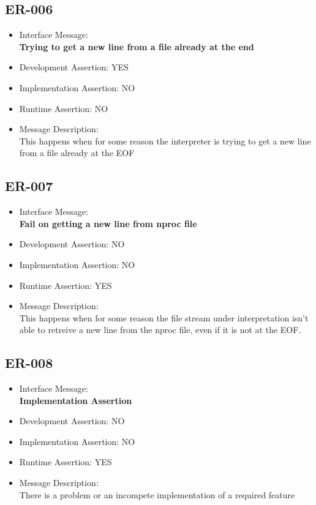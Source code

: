\subsection{ER-006}
\begin{itemize}
  \item Interface Message:\\[1em]\textbf{Trying to get a new line from a file already at the end}
  \item Development Assertion: YES
  \item Implementation Assertion: NO
  \item Runtime Assertion: NO
  \item Message Description:\\[1em]This happens when for some reason the interpreter is trying to get a new line from a file already at the EOF
\end{itemize}

\subsection{ER-007}
\begin{itemize}
  \item Interface Message:\\[1em]\textbf{Fail on getting a new line from nproc file}
  \item Development Assertion: NO
  \item Implementation Assertion: NO
  \item Runtime Assertion: YES
  \item Message Description:\\[1em]This happens when for some reason the file stream under interpretation isn't able to retreive a new line from the nproc file, even if it is not at the EOF.
\end{itemize}

\subsection{ER-008}
\begin{itemize}
  \item Interface Message:\\[1em]\textbf{Implementation Assertion}
  \item Development Assertion: NO
  \item Implementation Assertion: NO
  \item Runtime Assertion: YES
  \item Message Description:\\[1em]There is a problem or an incompete implementation of a required feature
\end{itemize}

